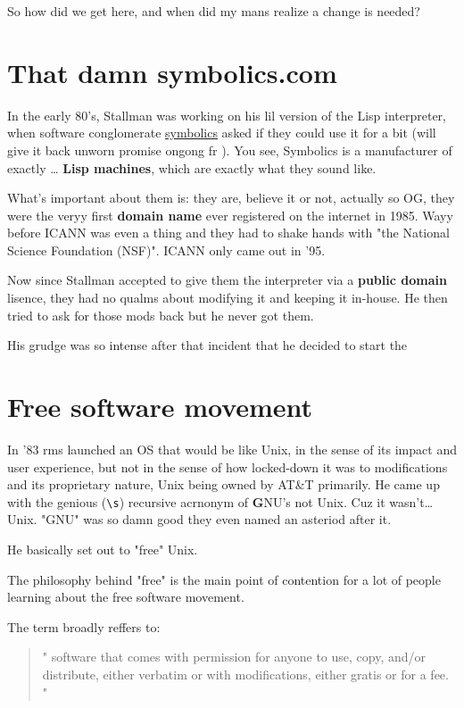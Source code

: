 \documentclass[sigplan,screen]{acmart}
\begin{document}
So how did we get here, and when did my mans realize a change is needed?

\section{That damn symbolics.com}
In the early 80's, Stallman was working on his lil version of the Lisp interpreter, when software conglomerate \href{https://symbolics.com}{symbolics} asked if they could use it for a bit (will give it back unworn promise ongong fr ). You see, Symbolics is a manufacturer of exactly \ldots \textbf{ Lisp machines}, which are exactly what they sound like.

What's important about them is: they are, believe it or not, actually so OG, they were the veryy first \textbf{domain name} ever registered on the internet in 1985. Wayy before ICANN was even a thing and they had to shake hands with "the National Science Foundation (NSF)". ICANN only came out in '95. \cite{national-science-foundation}

Now since Stallman accepted to give them the interpreter via a \textbf{public domain} lisence, they had no qualms about modifying it and keeping it in-house. He then tried to ask for those mods back but he never got them.

His grudge was so intense after that incident that he decided to start the

\section{Free software movement}
In '83 rms launched an OS that would be like Unix, in the sense of its impact and user experience, but not in the sense of how locked-down it was to modifications and its proprietary nature, Unix being owned by AT\&T primarily. He came up with the genious (\verb|\s|) recursive acrnonym of \textbf{G}NU's not Unix. Cuz it wasn't\ldots Unix. "GNU" was so damn good they even named an asteriod after it. \cite{gnu-asteriod}

He basically set out to "free" Unix.

The philosophy behind "free" is the main point of contention for a lot of people learning about the free software movement.

The term broadly reffers to:

\begin{quote}
	"
	software that comes with permission for anyone to use, copy, and/or distribute, either verbatim or with modifications, either gratis or for a fee.
	"
\end{quote}
\end{document}

